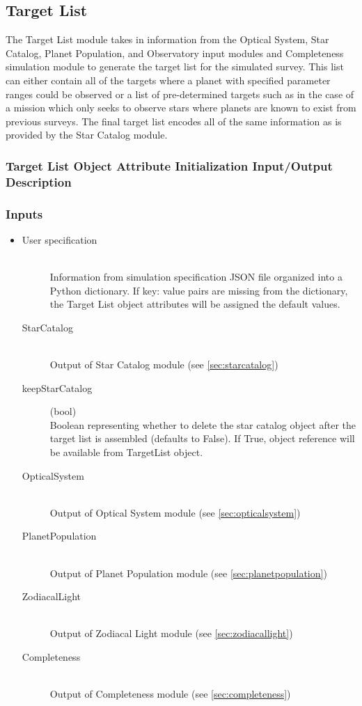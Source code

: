\documentclass[cleanfoot]{asme2ej}
\begin{document}

\subsection{Target List}
The Target List module takes in information from the Optical System, Star Catalog, Planet Population, and Observatory input modules and Completeness simulation module to generate the target list for the simulated survey.  This list can either contain all of the targets where a planet with specified parameter ranges could be observed or a list of pre-determined targets such as in the case of a mission which only seeks to observe stars where planets are known to exist from previous surveys.  The final target list encodes all of the same information as is provided by the Star Catalog module.

\label{sec:targetlist}
\subsubsection{Target List Object Attribute Initialization Input/Output Description}
\subsubsection*{Inputs}
\begin{itemize}
    \item 
    \begin{description}
        \item[User specification] \hfill \\
        Information from simulation specification JSON file organized into a Python dictionary. If key: value pairs are missing from the dictionary, the Target List object attributes will be assigned the default values.
        \item[StarCatalog] \hfill \\
        Output of Star Catalog module (see \ref{sec:starcatalog})
        \item[keepStarCatalog] (bool) \hfill \\
        Boolean representing whether to delete the star catalog object after the target list is assembled (defaults to False).  If True, object reference will be available from TargetList object.
        \item[OpticalSystem] \hfill \\
        Output of Optical System module (see \ref{sec:opticalsystem})
        \item[PlanetPopulation] \hfill \\
        Output of Planet Population module (see \ref{sec:planetpopulation})
        \item[ZodiacalLight] \hfill \\
        Output of Zodiacal Light module (see \ref{sec:zodiacallight})
        \item[Completeness] \hfill \\
        Output of Completeness module (see \ref{sec:completeness})
    \end{description}
\end{itemize}
\end{document}
